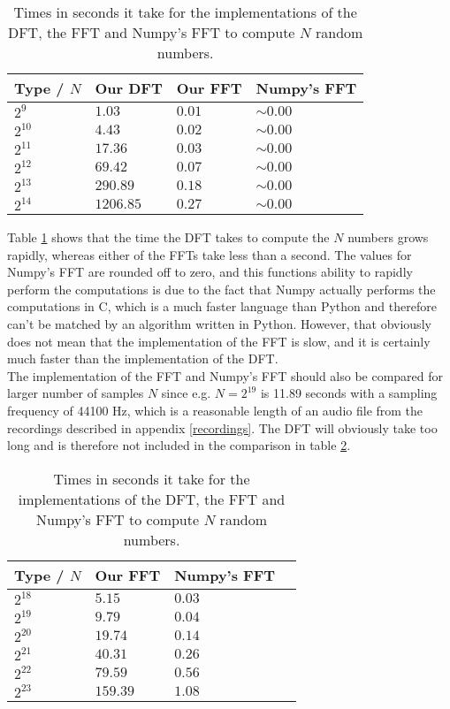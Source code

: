 \begin{table}[H]
\centering
\begin{tabular}{|l|l|l|l|}
\hline
Type / $N$ & Our DFT   & Our FFT & Numpy's FFT \\ \hline
$2^9$  	   & $1.03$    & $0.01$  & $\sim 0.00$ \\ \hline
$2^{10}$   & $4.43$    & $0.02$  & $\sim 0.00$ \\ \hline
$2^{11}$   & $17.36$   & $0.03$  & $\sim 0.00$ \\ \hline
$2^{12}$   & $69.42$   & $0.07$  & $\sim 0.00$ \\ \hline
$2^{13}$   & $290.89$  & $0.18$  & $\sim 0.00$ \\ \hline
$2^{14}$   & $1206.85$ & $0.27$  & $\sim 0.00$ \\ \hline
\end{tabular}
\caption{Times in seconds it take for the implementations of the DFT, the FFT and Numpy's FFT to compute $N$ random numbers.}
\label{tab:FTcompare}
\end{table}

Table \ref{tab:FTcompare} shows that the time the DFT takes to compute the $N$ numbers grows rapidly, whereas either of the FFTs take less than a second. The values for Numpy's FFT are rounded off to zero, and this functions ability to rapidly perform the computations is due to the fact that Numpy actually performs the computations in C, which is a much faster language than Python and therefore can't be matched by an algorithm written in Python. However, that obviously does not mean that the implementation of the FFT is slow, and it is certainly much faster than the implementation of the DFT. \\
The implementation of the FFT and Numpy's FFT should also be compared for larger number of samples $N$ since e.g. $N = 2^{19}$ is 11.89 seconds with a sampling frequency of 44100 Hz, which is a reasonable length of an audio file from the recordings described in appendix \ref{recordings}. The DFT will obviously take too long and is therefore not included in the comparison in table \ref{tab:FT2compare}.

\begin{table}[H]
\centering
\label{tab:FT2compare}
\begin{tabular}{|l|l|l|l|}
\hline
Type / $N$ & Our FFT   & Numpy's FFT \\ \hline
$2^{18}$   & $5.15$    & $0.03$ \\ \hline
$2^{19}$   & $9.79$    & $0.04$ \\ \hline
$2^{20}$   & $19.74$   & $0.14$ \\ \hline
$2^{21}$   & $40.31$   & $0.26$ \\ \hline
$2^{22}$   & $79.59$   & $0.56$ \\ \hline
$2^{23}$   & $159.39$  & $1.08$ \\ \hline
\end{tabular}
\caption{Times in seconds it take for the implementations of the DFT, the FFT and Numpy's FFT to compute $N$ random numbers.}
\end{table}

